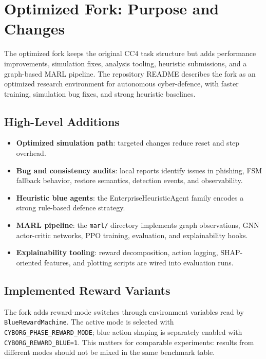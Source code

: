\section{Optimized Fork: Purpose and Changes}

The optimized fork keeps the original CC4 task structure but adds performance improvements, simulation fixes, analysis tooling, heuristic submissions, and a graph-based MARL pipeline. The repository README describes the fork as an optimized research environment for autonomous cyber-defence, with faster training, simulation bug fixes, and strong heuristic baselines.

\subsection{High-Level Additions}

\begin{itemize}
  \item \textbf{Optimized simulation path}: targeted changes reduce reset and step overhead.
  \item \textbf{Bug and consistency audits}: local reports identify issues in phishing, FSM fallback behavior, restore semantics, detection events, and observability.
  \item \textbf{Heuristic blue agents}: the EnterpriseHeuristicAgent family encodes a strong rule-based defence strategy.
  \item \textbf{MARL pipeline}: the \texttt{marl/} directory implements graph observations, GNN actor-critic networks, PPO training, evaluation, and explainability hooks.
  \item \textbf{Explainability tooling}: reward decomposition, action logging, SHAP-oriented features, and plotting scripts are wired into evaluation runs.
\end{itemize}

\subsection{Implemented Reward Variants}

The fork adds reward-mode switches through environment variables read by
\texttt{BlueRewardMachine}. The active mode is selected with
\texttt{CYBORG\_PHASE\_REWARD\_MODE}; blue action shaping is separately enabled
with \texttt{CYBORG\_REWARD\_BLUE=1}. This matters for comparable experiments:
results from different modes should not be mixed in the same benchmark table.

